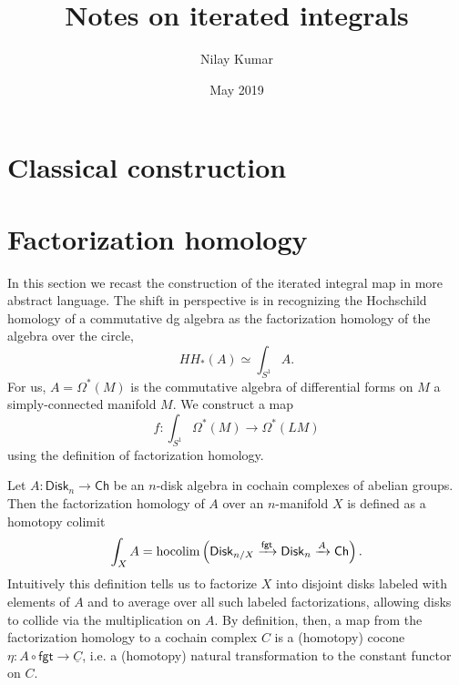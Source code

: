 \documentclass{amsart}
\title{Notes on iterated integrals}
\author{Nilay Kumar}
\date{May 2019}
\begin{document}
\maketitle

\section{Classical construction}

\section{Factorization homology}

In this section we recast the construction of the iterated integral map in more
abstract language. The shift in perspective is in recognizing the Hochschild 
homology of a commutative dg algebra as the factorization homology of the
algebra over the circle,
\begin{equation*}
    HH_*(A) \simeq \int_{S^1} A.
\end{equation*}
For us, $A=\Omega^*(M)$ is the commutative algebra of differential forms on $M$
a simply-connected manifold $M$. We construct a map
\begin{equation*}
    f \colon \int_{S^1}\Omega^*(M) \longrightarrow \Omega^*(LM)
\end{equation*}
using the definition of factorization homology.

Let $A\colon \mathsf{Disk}_n\to \mathsf{Ch}$ be an $n$-disk algebra in cochain
complexes of abelian groups. Then the factorization homology of $A$ over an
$n$-manifold $X$ is defined as a homotopy colimit
\begin{equation*}
    \int_X A = \operatorname{hocolim}\left(\mathsf{Disk}_{n/X} \xrightarrow{\mathsf{fgt}}
    \mathsf{Disk}_n \xrightarrow{A} \mathsf{Ch}\right).
\end{equation*}
Intuitively this definition tells us to factorize $X$ into disjoint disks
labeled with
elements of $A$ and to average over all such labeled factorizations, allowing 
disks to collide via the multiplication on $A$. By definition, then, a map from
the factorization homology to a cochain complex $C$ is a (homotopy) cocone
$\eta\colon A\circ\mathsf{fgt} \to \underline{C}$, i.e. a (homotopy) natural
transformation to the constant functor on $C$.
\end{document}
